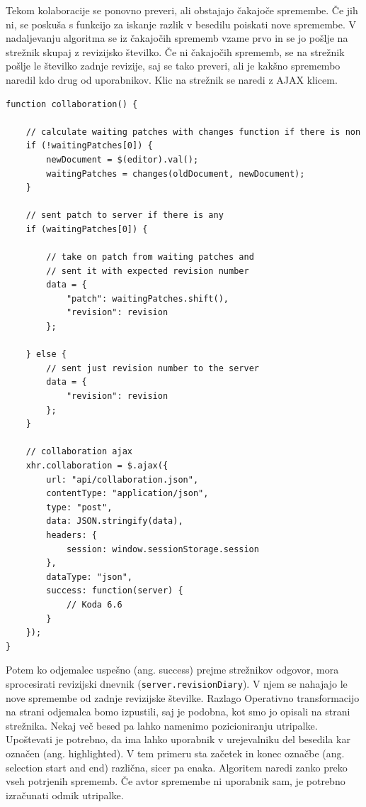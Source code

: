\documentclass[a4paper, 12pt, twoside]{book}
\begin{document}
Tekom kolaboracije se ponovno preveri, ali obstajajo čakajoče spremembe. Če jih ni, se poskuša s funkcijo za iskanje razlik v besedilu poiskati nove spremembe. V nadaljevanju algoritma se iz čakajočih sprememb vzame prvo in se jo pošlje na strežnik skupaj z revizijsko številko. Če ni čakajočih sprememb, se na strežnik pošlje le številko zadnje revizije, saj se tako preveri, ali je kakšno spremembo naredil kdo drug od uporabnikov. Klic na strežnik se naredi z AJAX klicem.

\pagebreak
\begin{lstlisting}[title={Koda 6.5: Iskanje sprememb v besedilu in AJAX klic na strežnik.}]
function collaboration() {

    // calculate waiting patches with changes function if there is non
    if (!waitingPatches[0]) {
        newDocument = $(editor).val();
        waitingPatches = changes(oldDocument, newDocument);
    }

    // sent patch to server if there is any
    if (waitingPatches[0]) {

        // take on patch from waiting patches and
        // sent it with expected revision number
        data = {
            "patch": waitingPatches.shift(),
            "revision": revision
        };
        
    } else {
        // sent just revision number to the server
        data = {
            "revision": revision
        };
    }

    // collaboration ajax
    xhr.collaboration = $.ajax({
        url: "api/collaboration.json",
        contentType: "application/json",
        type: "post",
        data: JSON.stringify(data),
        headers: {
            session: window.sessionStorage.session
        },
        dataType: "json",
        success: function(server) {
            // Koda 6.6
        }
    });
}
\end{lstlisting}

Potem ko odjemalec uspešno (ang. success) prejme strežnikov odgovor, mora sprocesirati revizijski dnevnik ({\tt server.revisionDiary}). V njem se nahajajo le nove spremembe od zadnje revizijske številke. Razlago Operativno transformacijo na strani odjemalca bomo izpustili, saj je podobna, kot smo jo opisali na strani strežnika. Nekaj več besed pa lahko namenimo pozicioniranju utripalke. Upoštevati je potrebno, da ima lahko uporabnik v urejevalniku del besedila kar označen (ang. highlighted). V tem primeru sta začetek in konec označbe (ang. selection start and end) različna, sicer pa enaka. Algoritem naredi zanko preko vseh potrjenih sprememb. Če avtor spremembe ni uporabnik sam, je potrebno izračunati odmik utripalke.
\end{document}
